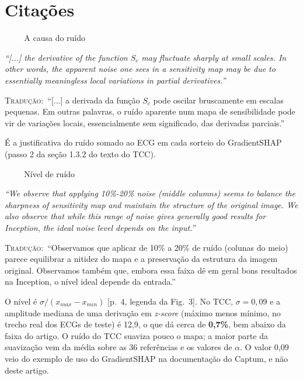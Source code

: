 \documentclass[11pt,a4paper]{article}
\newcommand{\pagechip}[1]{{\setlength{\fboxsep}{1.5pt}\colorbox{cAcc}{\textcolor{white}{\scriptsize\texttt{#1}}}}}
\newenvironment{origquote}{\par\itshape\small}{\par}
\newenvironment{tradquote}{\par\small\textsc{Tradução:}\ }{\par}
\newcommand{\explab}[1]{\par\smallskip{\small\color{cAcc}\textbf{\MakeUppercase{#1}}}\par}
\begin{document}
\section{Citações}

\begin{citacard}{\pagechip{p. 2} A causa do ruído}
\begin{origquote}“[...] the derivative of the function $S_c$ may fluctuate sharply at small scales. In other words, the apparent noise one sees in a sensitivity map may be due to essentially meaningless local variations in partial derivatives.”\end{origquote}
\begin{tradquote}“[...] a derivada da função $S_c$ pode oscilar bruscamente em escalas pequenas. Em outras palavras, o ruído aparente num mapa de sensibilidade pode vir de variações locais, essencialmente sem significado, das derivadas parciais.”\end{tradquote}
\explab{Explicação}
É a justificativa do ruído somado ao ECG em cada sorteio do GradientSHAP (passo 2 da seção 1.3.2 do texto do TCC).
\end{citacard}

\begin{citacard}{\pagechip{p. 4} Nível de ruído}
\begin{origquote}“We observe that applying 10\%-20\% noise (middle columns) seems to balance the sharpness of sensitivity map and maintain the structure of the original image. We also observe that while this range of noise gives generally good results for Inception, the ideal noise level depends on the input.”\end{origquote}
\begin{tradquote}“Observamos que aplicar de 10\% a 20\% de ruído (colunas do meio) parece equilibrar a nitidez do mapa e a preservação da estrutura da imagem original. Observamos também que, embora essa faixa dê em geral bons resultados na Inception, o nível ideal depende da entrada.”\end{tradquote}
\explab{Explicação}
O nível é $\sigma/(x_{max} - x_{min})$ [p.~4, legenda da Fig.~3]. No TCC, $\sigma = 0{,}09$ e a amplitude mediana de uma derivação em \textit{z-score} (máximo menos mínimo, no trecho real dos ECGs de teste) é 12,9, o que dá cerca de \textbf{0,7\%}, bem abaixo da faixa do artigo. O ruído do TCC suaviza pouco o mapa; a maior parte da suavização vem da média sobre as 36 referências e os valores de $\alpha$. O valor 0,09 veio do exemplo de uso do GradientSHAP na documentação do Captum, e não deste artigo.
\end{citacard}
\end{document}
